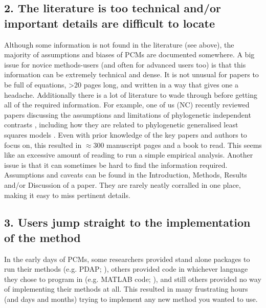 \documentclass[a4paper,12pt]{article}
\begin{document}
  \subsection{2. The literature is too technical and/or important details are difficult to locate}
    Although some information is not found in the literature (see above), the majority of assumptions and biases of PCMs are documented somewhere. 
    A big issue for novice methods-users (and often for advanced users too) is that this information can be extremely technical and dense.
    It is not unusual for papers to be full of equations, \textgreater 20 pages long, and written in a way that gives one a headache. 
    Additionally there is a lot of literature to wade through before getting all of the required information. 
    For example, one of us (NC) recently reviewed papers discussing the assumptions and limitations of phylogenetic independent contrasts \citep{felsenstein1985phylogenies}, including how they are related to phylogenetic generalised least squares models \citep{garland2000using,rohle2006comment,blomberg2012independent}. 
    Even with prior knowledge of the key papers and authors to focus on, this resulted in $\approx 300$ manuscript pages and a book to read.
    This seems like an excessive amount of reading to run a simple empirical analysis.
    Another issue is that it can sometimes be hard to find the information required. 
    Assumptions and caveats can be found in the Introduction, Methods, Results and/or Discussion of a paper. 
    They are rarely neatly corralled in one place, making it easy to miss pertinent details. 

  \subsection{3. Users jump straight to the implementation of the method}
    In the early days of PCMs, some researchers provided stand alone packages to run their methods (e.g. PDAP; \citealp{diaz1996testing}), others provided code in whichever language they chose to program in (e.g. MATLAB code; \citealp{rohlf2001comparative}), and still others provided no way of implementing their methods at all. 
    This resulted in many frustrating hours (and days and months) trying to implement any new method you wanted to use.\\
\end{document}
